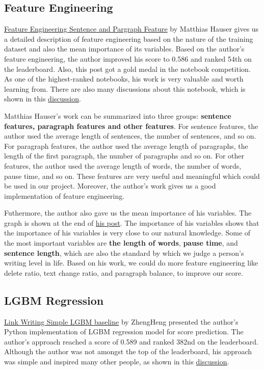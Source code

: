 \documentclass[8pt]{report}
\begin{document}
\subsection{Feature Engineering}
\href{https://www.kaggle.com/code/hiarsl/feature-engineering-sentence-paragraph-features}{Feature Engineering Sentence and Pargraph Feature} by Matthias Hauser
gives us a detailed description of feature engineering based on the nature of the training dataset and also the mean importance of its variables. Based on the author's feature engineering,
the author improved his score to 0.586 and ranked 54th on the leaderboard. Also, this post got a gold medal in the notebook competition. As one of the highest-ranked notebooks, 
his work is very valuable and worth learning from. There are also many discussions about this notebook, which is shown in this \href{https://www.kaggle.com/code/hiarsl/feature-engineering-sentence-paragraph-features/comments}{discussion}.

Matthias Hauser's work can be summarized into three groups: \textbf{sentence features, paragraph features and other features}. 
For sentence features, the author used the average length of sentences, the number of sentences, and so on. 
For paragraph features, the author used the average length of paragraphs, the length of the first paragraph, the number of paragraphs and so on.
For other features, the author used the average length of words, the number of words, pause time, and so on.
These features are very useful and meaningful which could be used in our project. Moreover, the author's work gives us a good implementation of feature engineering.

Futhermore, the author also gave us the mean importance of his variables. The graph is shown at the end of \href{https://www.kaggle.com/code/hiarsl/feature-engineering-sentence-paragraph-features/notebook}{his post}.
The importance of his variables shows that the importance of his variables is very close to our natural knowledge. Some of the most important variables are \textbf{the length of words}, \textbf{pause time}, and \textbf{sentence length}, which are also the standard by which we judge a person’s writing level in life.
Based on his work, we could do more feature engineering like delete ratio, text change ratio, and paragraph balance, to improve our score.


\subsection{LGBM Regression}
\href{https://www.kaggle.com/code/hengzheng/link-writing-simple-lgbm-baseline}{Link Writing Simple LGBM baseline} by ZhengHeng
presented the author's Python implementation of LGBM regression model for score prediction. The author's approach 
reached a score of 0.589 and ranked 382nd on the leaderboard. Although the author was not amongst the top of the leaderboard, 
his approach was simple and inspired many other people, as shown in this \href{https://www.kaggle.com/competitions/linking-writing-processes-to-writing-quality/discussion/451081}{discussion}.
\end{document}

